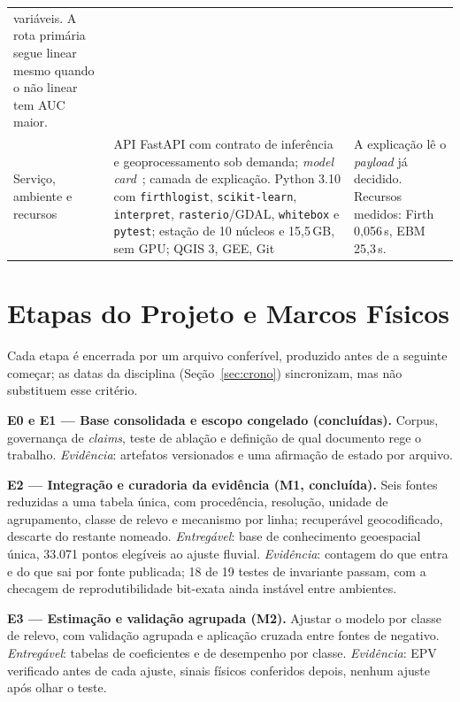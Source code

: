 \documentclass[conference]{IEEEtran}
\begin{document}
\begin{table}[!t]
\begin{tabular}{@{}>{\raggedright\arraybackslash}p{2.05cm}>{\raggedright\arraybackslash}p{7.6cm}>{\raggedright\arraybackslash}p{6.5cm}@{}}
variáveis. A rota primária segue linear mesmo quando o não linear tem AUC maior. \\
Serviço, ambiente e recursos &
API FastAPI com contrato de inferência e geoprocessamento sob demanda; \emph{model
card}~\cite{mitchell2019}; camada de explicação. Python 3.10 com \texttt{firthlogist},
\texttt{scikit-learn}, \texttt{interpret}, \texttt{rasterio}/GDAL, \texttt{whitebox} e
\texttt{pytest}; estação de 10 núcleos e 15,5\,GB, sem GPU; QGIS 3, GEE, Git &
A explicação lê o \emph{payload} já decidido. Recursos medidos: Firth 0,056\,s,
EBM 25,3\,s. \\
\bottomrule
\end{tabular}
\end{table}

\section{Etapas do Projeto e Marcos Físicos}
\label{sec:etapas}

Cada etapa é encerrada por um arquivo conferível, produzido antes de a seguinte
começar; as datas da disciplina (Seção~\ref{sec:crono}) sincronizam, mas não
substituem esse critério.

\textbf{E0 e E1 --- Base consolidada e escopo congelado (concluídas).} Corpus,
governança de \emph{claims}, teste de ablação e definição de qual documento rege
o trabalho. \emph{Evidência}: artefatos versionados e uma afirmação de estado por
arquivo.

\textbf{E2 --- Integração e curadoria da evidência (M1, concluída).} Seis fontes
reduzidas a uma tabela única, com procedência, resolução, unidade de
agrupamento, classe de relevo e mecanismo por linha; recuperável geocodificado,
descarte do restante nomeado. \emph{Entregável}: base de conhecimento
geoespacial única, 33.071 pontos elegíveis ao ajuste fluvial. \emph{Evidência}:
contagem do que entra e do que sai por fonte publicada; 18 de 19 testes de
invariante passam, com a checagem de reprodutibilidade bit-exata ainda
instável entre ambientes.

\textbf{E3 --- Estimação e validação agrupada (M2).} Ajustar o modelo por classe
de relevo, com validação agrupada e aplicação cruzada entre fontes de negativo.
\emph{Entregável}: tabelas de coeficientes e de desempenho por classe.
\emph{Evidência}: EPV verificado antes de cada ajuste, sinais físicos conferidos
depois, nenhum ajuste após olhar o teste.
\end{document}
